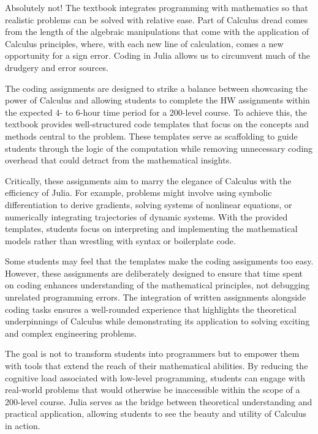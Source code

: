 Absolutely not! The textbook integrates programming with mathematics so that realistic problems can be solved with relative ease. Part of Calculus dread comes from the length of the algebraic manipulations that come with the application of Calculus principles, where, with each new line of calculation, comes a new opportunity for a sign error. Coding in Julia allows us to circumvent much of the drudgery and error sources. 

The coding assignments are designed to strike a balance between showcasing the power of Calculus and allowing students to complete the HW assignments within the expected 4- to 6-hour time period for a 200-level course. To achieve this, the textbook provides well-structured code templates that focus on the concepts and methods central to the problem. These templates serve as scaffolding to guide students through the logic of the computation while removing unnecessary coding overhead that could detract from the mathematical insights.

Critically, these assignments aim to marry the elegance of Calculus with the efficiency of Julia. For example, problems might involve using symbolic differentiation to derive gradients, solving systems of nonlinear equations, or numerically integrating trajectories of dynamic systems. With the provided templates, students focus on interpreting and implementing the mathematical models rather than wrestling with syntax or boilerplate code.

Some students may feel that the templates make the coding assignments too easy. However, these assignments are deliberately designed to ensure that time spent on coding enhances understanding of the mathematical principles, not debugging unrelated programming errors. The integration of written assignments alongside coding tasks ensures a well-rounded experience that highlights the theoretical underpinnings of Calculus while demonstrating its application to solving exciting and complex engineering problems.

The goal is not to transform students into programmers but to empower them with tools that extend the reach of their mathematical abilities. By reducing the cognitive load associated with low-level programming, students can engage with real-world problems that would otherwise be inaccessible within the scope of a 200-level course. Julia serves as the bridge between theoretical understanding and practical application, allowing students to see the beauty and utility of Calculus in action.

